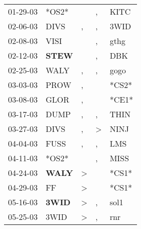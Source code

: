 \begin{supertabular}{p{0.07\textwidth}p{0.06\textwidth}p{0.02\textwidth}p{0.02\textwidth}p{0.06\textwidth}}
          01-29-03\textsuperscript{} &                            *OS2* &                  &             , &           KITC\textsuperscript{} \\
          02-06-03\textsuperscript{} &           DIVS\textsuperscript{} &                , &             , &           3WID\textsuperscript{} \\
          02-08-03\textsuperscript{} &           VISI\textsuperscript{} &                  &             , &           gthg\textsuperscript{} \\
          02-12-03\textsuperscript{} &  \textbf{STEW\textsuperscript{}} &                  &             , &            DBK\textsuperscript{} \\
          02-25-03\textsuperscript{} &           WALY\textsuperscript{} &                , &             , &           gogo\textsuperscript{} \\
          03-03-03\textsuperscript{} &           PROW\textsuperscript{} &                , &               &                            *CS2* \\
          03-08-03\textsuperscript{} &           GLOR\textsuperscript{} &                , &               &                            *CE1* \\
          03-17-03\textsuperscript{} &           DUMP\textsuperscript{} &                , &             , &           THIN\textsuperscript{} \\
          03-27-03\textsuperscript{} &           DIVS\textsuperscript{} &                , &  \textgreater &           NINJ\textsuperscript{} \\
          04-04-03\textsuperscript{} &           FUSS\textsuperscript{} &                , &             , &            LMS\textsuperscript{} \\
          04-11-03\textsuperscript{} &                            *OS2* &                  &             , &           MISS\textsuperscript{} \\
          04-24-03\textsuperscript{} &  \textbf{WALY\textsuperscript{}} &     \textgreater &               &                            *CS1* \\
          04-29-03\textsuperscript{} &             FF\textsuperscript{} &     \textgreater &               &                            *CS1* \\
          05-16-03\textsuperscript{} &  \textbf{3WID\textsuperscript{}} &     \textgreater &             , &           sol1\textsuperscript{} \\
          05-25-03\textsuperscript{} &           3WID\textsuperscript{} &     \textgreater &             , &            rnr\textsuperscript{} \\

\end{supertabular}
